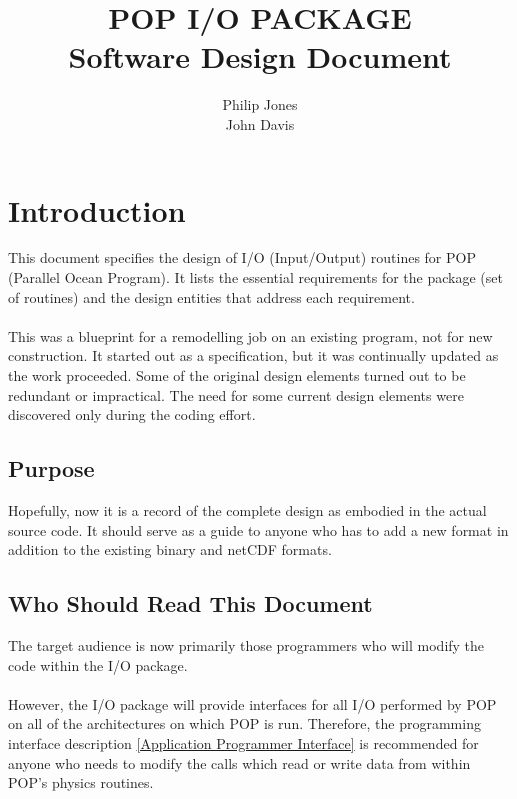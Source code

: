 \documentclass[11pt]{article}
\begin{document}
\title{POP I/O PACKAGE \\ Software Design Document}

\author{Philip Jones \\ John Davis}


\maketitle

\tableofcontents

\section{Introduction}
This document specifies the design of I/O (Input/Output) routines 
for POP (Parallel Ocean Program).  It lists the essential requirements 
for the package (set of routines) and the design entities that address 
each requirement.  

\paragraph{}
This was a blueprint for a remodelling job on an existing program, 
not for new construction.  It started out as a specification, but it 
was continually updated as the work proceeded.  Some of the original 
design elements turned out to be redundant or impractical.  The 
need for some current design elements were discovered only during 
the coding effort.  

\subsection{Purpose}
Hopefully, now it is a record of the complete design as embodied 
in the actual source code.  It should serve as a guide to anyone 
who has to add a new format in addition to the existing binary 
and netCDF formats.

\subsection{Who Should Read This Document}
The target audience is now primarily those programmers who will 
modify the code within the I/O package.  
\paragraph{}
However, the I/O package will provide interfaces for all I/O performed 
by POP on all of the architectures on which POP is run.
Therefore, the programming interface description 
\ref{Application Programmer Interface} is recommended for anyone 
who needs to modify the calls which read or write data from 
within POP's physics routines.
\end{document}
